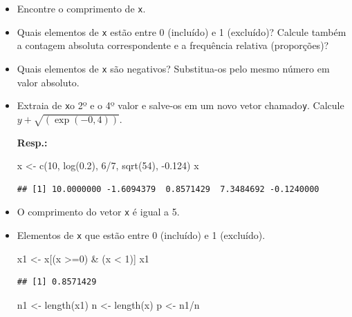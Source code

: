 \documentclass[
]{article}
\newenvironment{Shaded}{\begin{snugshade}}{\end{snugshade}}
\newcommand{\DecValTok}[1]{\textcolor[rgb]{0.00,0.00,0.81}{#1}}
\newcommand{\FloatTok}[1]{\textcolor[rgb]{0.00,0.00,0.81}{#1}}
\newcommand{\FunctionTok}[1]{\textcolor[rgb]{0.00,0.00,0.00}{#1}}
\newcommand{\NormalTok}[1]{#1}
\newcommand{\OtherTok}[1]{\textcolor[rgb]{0.56,0.35,0.01}{#1}}
\newcommand{\SpecialCharTok}[1]{\textcolor[rgb]{0.00,0.00,0.00}{#1}}
\begin{document}
\begin{itemize}
\item
  Encontre o comprimento de \texttt{x}.
\item
  Quais elementos de \texttt{x} estão entre 0 (incluído) e 1 (excluído)? Calcule também a contagem absoluta correspondente e a frequência relativa (proporções)?
\item
  Quais elementos de \texttt{x} são negativos? Substitua-os pelo mesmo número em valor absoluto.
\item
  Extraia de \texttt{x}o 2º e o 4º valor e salve-os em um novo vetor chamado\texttt{y}. Calcule \(y + \sqrt{(\exp{(-0,4)})}\).

  \textbf{Resp.:}

\begin{Shaded}
\begin{Highlighting}[]
\NormalTok{x }\OtherTok{\textless{}{-}} \FunctionTok{c}\NormalTok{(}\DecValTok{10}\NormalTok{, }\FunctionTok{log}\NormalTok{(}\FloatTok{0.2}\NormalTok{), }\DecValTok{6}\SpecialCharTok{/}\DecValTok{7}\NormalTok{, }\FunctionTok{sqrt}\NormalTok{(}\DecValTok{54}\NormalTok{), }\SpecialCharTok{{-}}\FloatTok{0.124}\NormalTok{)}
\NormalTok{x}
\end{Highlighting}
\end{Shaded}

\begin{verbatim}
## [1] 10.0000000 -1.6094379  0.8571429  7.3484692 -0.1240000
\end{verbatim}
\item
  O comprimento do vetor \texttt{x} é igual a 5.
\item
  Elementos de \texttt{x} que estão entre 0 (incluído) e 1 (excluído).

\begin{Shaded}
\begin{Highlighting}[]
\NormalTok{x1 }\OtherTok{\textless{}{-}}\NormalTok{  x[(x }\SpecialCharTok{\textgreater{}=}\DecValTok{0}\NormalTok{) }\SpecialCharTok{\&}\NormalTok{ (x }\SpecialCharTok{\textless{}} \DecValTok{1}\NormalTok{)]}
\NormalTok{x1}
\end{Highlighting}
\end{Shaded}

\begin{verbatim}
## [1] 0.8571429
\end{verbatim}

\begin{Shaded}
\begin{Highlighting}[]
\NormalTok{n1 }\OtherTok{\textless{}{-}}  \FunctionTok{length}\NormalTok{(x1)}
\NormalTok{n }\OtherTok{\textless{}{-}} \FunctionTok{length}\NormalTok{(x)}
\NormalTok{p }\OtherTok{\textless{}{-}}\NormalTok{  n1}\SpecialCharTok{/}\NormalTok{n}
\end{Highlighting}
\end{Shaded}


\end{itemize}
\end{document}
